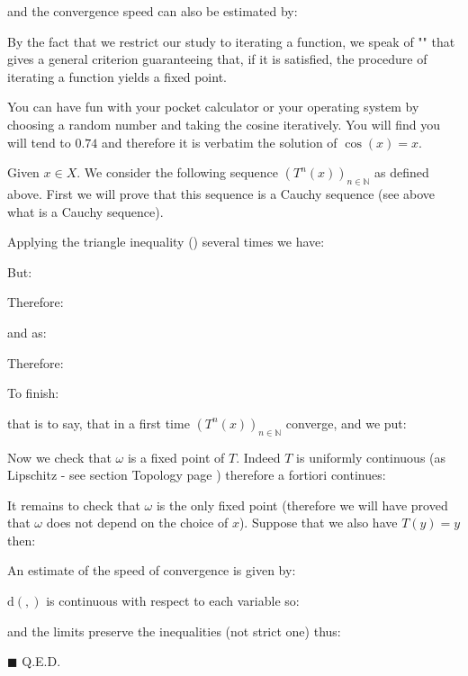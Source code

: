 	and the convergence speed can also be estimated by:
	
	By the fact that we restrict our study to iterating a function, we speak of "\label{banach fixed point theorem}" that gives a general criterion guaranteeing that, if it is satisfied, the procedure of iterating a function yields a fixed point.
	\begin{tcolorbox}[title=Remark,colframe=black,arc=10pt]
	You can have fun with your pocket calculator or your operating system by choosing a random number and taking the cosine iteratively. You will find you will tend to $0.74$ and therefore it is verbatim the solution of $\cos (x) = x$.
	\end{tcolorbox}
	\begin{dem}
	Given $x\in X$. We consider the following sequence $(T^n(x))_{n\in \mathbb{N}}$ as defined above. First we will prove that this sequence is a Cauchy sequence (see above what is a Cauchy sequence).

	Applying the triangle inequality () several times we have:
	
	But:
	
	Therefore:
	
	and as:
	
	Therefore:
	
	To finish:
	
	that is to say, that in a first time $(T^n(x))_{n\in \mathbb{N}}$ converge, and we put:
	
	Now we check that $\omega$ is a fixed point of $T$. Indeed $T$ is uniformly continuous (as Lipschitz - see section Topology page \pageref{lipschitz functions}) therefore a fortiori continues:
	
	It remains to check that $\omega$ is the only fixed point (therefore we will have proved that $\omega$ does not depend on the choice of $x$). Suppose that we also have $T(y)=y$ then:
	
	An estimate of the speed of convergence is given by:
	
	$\mathrm{d}(,)$ is continuous with respect to each variable so:
	
	and the limits preserve the inequalities (not strict one) thus:
	
	\begin{flushright}
		$\blacksquare$  Q.E.D.
	\end{flushright}
	\end{dem}
	
